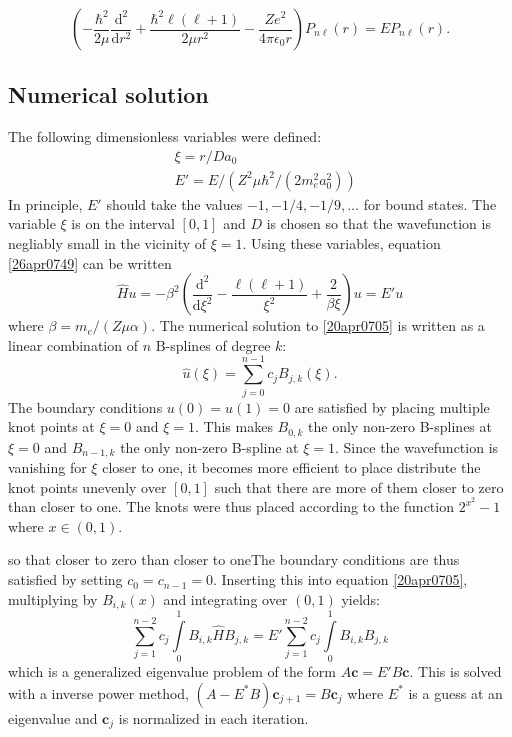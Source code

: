 \documentclass[twocolumn]{article}
\begin{document}
\begin{large}
\begin{equation}
    \label{26apr0749}
    \left(-\frac{\hbar^2}{2\mu}\frac{\text{d}^2}{\text{d}r^2} + \frac{\hbar^2\ell(\ell+1)}{2\mu r^2} - \frac{Ze^2}{4\pi\epsilon_0r}\right)P_{n\ell}(r) = EP_{n\ell}(r).
\end{equation}

\subsection*{Numerical solution}
The following dimensionless variables were defined:
\begin{equation}
    \begin{split}
        &\xi = r/Da_0 \\ 
        &E' = E/\left(Z^2\mu\hbar^2/(2m_e^2a_0^2)\right)
    \end{split}
\end{equation}
In principle, $E'$ should take the values $-1,-1/4,-1/9,\dots$ for bound states. The variable $\xi$ is on the interval $[0,1]$ and $D$ is chosen so that the wavefunction is negliably small in the vicinity of $\xi=1$. Using these variables, equation \eqref{26apr0749} can be written
\begin{equation}
    \label{20apr0705}
    \hat{H}u = -\beta^2\left(\frac{\text{d}^2}{\text{d}\xi^2}-\frac{\ell(\ell+1)}{\xi^2}+\frac{2}{\beta\xi}\right)u = E'u
\end{equation}
where $\beta = m_e/(Z\mu\alpha)$. The numerical solution to \eqref{20apr0705} is written as a linear combination of $n$ B-splines of degree $k$:
\begin{equation}
    \hat{u}(\xi) = \sum_{j=0}^{n-1}c_jB_{j,k}(\xi).
\end{equation}
The boundary conditions $u(0) = u(1) = 0$ are satisfied by placing multiple knot points at $\xi=0$ and $\xi=1$. This makes $B_{0,k}$ the only non-zero B-splines at $\xi=0$ and $B_{n-1,k}$ the only non-zero B-spline at $\xi = 1$. Since the wavefunction is vanishing for $\xi$ closer to one, it becomes more efficient to place distribute the knot points unevenly over $[0,1]$ such that there are more of them closer to zero than closer to one. The knots were thus placed according to the function $2^{x^2}-1$ where $x\in(0,1)$. 

so that closer to zero than closer to oneThe boundary conditions are thus satisfied by setting $c_0=c_{n-1}=0$. Inserting this into equation \eqref{20apr0705}, multiplying by $B_{i,k}(x)$ and integrating over $(0,1)$ yields:
\begin{equation}
    \sum_{j=1}^{n-2}c_j\int\limits_0^1B_{i,k}\hat{H}B_{j,k} = E'\sum_{j=1}^{n-2}c_j\int\limits_0^1B_{i,k}B_{j,k}
\end{equation}
which is a generalized eigenvalue problem of the form $A\mathbf{c} = E'B\mathbf{c}$. This is solved with a inverse power method, $(A-E^*B)\mathbf{c}_{j+1} = B\mathbf{c}_j$ where $E^*$ is a guess at an eigenvalue and $\mathbf{c}_j$ is normalized in each iteration.




\end{large}
\end{document}
